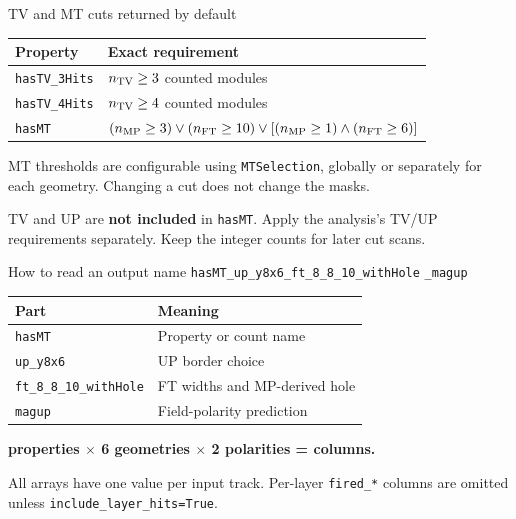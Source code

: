 \documentclass[aspectratio=169,11pt]{beamer}
\begin{document}
\begin{frame}{TV and MT cuts returned by default}
\begin{tabularx}{\textwidth}{@{}lX@{}}
\toprule Property & Exact requirement \\
\midrule
\texttt{hasTV\_3Hits} & $n_{\rm TV}\geq3$ counted modules \\
\texttt{hasTV\_4Hits} & $n_{\rm TV}\geq4$ counted modules \\
\texttt{hasMT} & $(n_{\rm MP}\geq3)\lor(n_{\rm FT}\geq10)\lor
[(n_{\rm MP}\geq1)\land(n_{\rm FT}\geq6)]$ \\
\bottomrule
\end{tabularx}\par
\vspace{5mm}
MT thresholds are configurable using \texttt{MTSelection}, globally or
separately for each geometry. Changing a cut does not change the masks.\par
\vspace{3mm}
TV and UP are \textbf{not included} in \texttt{hasMT}. Apply the analysis's TV/UP
requirements separately. Keep the integer counts for later cut scans.
\end{frame}

\begin{frame}{How to read an output name}
\vspace{2mm}
\texttt{\color{teal}hasMT}\texttt{\_\color{blue}up\_y8x6\_ft\_8\_8\_10\_withHole}%
\texttt{\_\color{ink}magup}\par
\vspace{5mm}
\begin{tabularx}{\textwidth}{@{}lX@{}}
\toprule Part & Meaning \\
\midrule
\texttt{hasMT} & Property or count name \\
\texttt{up\_y8x6} & UP border choice \\
\texttt{ft\_8\_8\_10\_withHole} & FT widths and MP-derived hole \\
\texttt{magup} & Field-polarity prediction \\
\bottomrule
\end{tabularx}\par
\vspace{4mm}
\textbf{\PropertyCount{} properties $\times$ 6 geometries $\times$ 2 polarities
= \ColumnCount{} columns.}\par\vspace{2mm}
All arrays have one value per input track. Per-layer \texttt{fired\_*}
columns are omitted unless \texttt{include\_layer\_hits=True}.
\end{frame}
\end{document}
